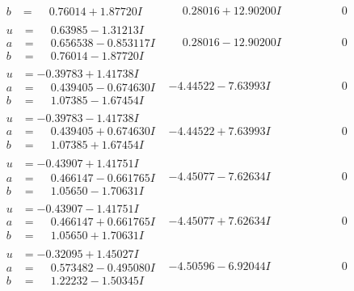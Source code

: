 \documentclass[1p]{elsarticle_modified}
\theoremstyle{definition}
\begin{document}
$$\begin{array}{c|c|c}
\begin{aligned}
b &= \phantom{-}0.76014 + 1.87720 I\end{aligned}
 & \phantom{-}0.28016 + 12.90200 I & \phantom{-0.000000 } 0 \\ \hline\begin{aligned}
u &= \phantom{-}0.63985 - 1.31213 I \\
a &= \phantom{-}0.656538 - 0.853117 I \\
b &= \phantom{-}0.76014 - 1.87720 I\end{aligned}
 & \phantom{-}0.28016 - 12.90200 I & \phantom{-0.000000 } 0 \\ \hline\begin{aligned}
u &= -0.39783 + 1.41738 I \\
a &= \phantom{-}0.439405 - 0.674630 I \\
b &= \phantom{-}1.07385 - 1.67454 I\end{aligned}
 & -4.44522 - 7.63993 I & \phantom{-0.000000 } 0 \\ \hline\begin{aligned}
u &= -0.39783 - 1.41738 I \\
a &= \phantom{-}0.439405 + 0.674630 I \\
b &= \phantom{-}1.07385 + 1.67454 I\end{aligned}
 & -4.44522 + 7.63993 I & \phantom{-0.000000 } 0 \\ \hline\begin{aligned}
u &= -0.43907 + 1.41751 I \\
a &= \phantom{-}0.466147 - 0.661765 I \\
b &= \phantom{-}1.05650 - 1.70631 I\end{aligned}
 & -4.45077 - 7.62634 I & \phantom{-0.000000 } 0 \\ \hline\begin{aligned}
u &= -0.43907 - 1.41751 I \\
a &= \phantom{-}0.466147 + 0.661765 I \\
b &= \phantom{-}1.05650 + 1.70631 I\end{aligned}
 & -4.45077 + 7.62634 I & \phantom{-0.000000 } 0 \\ \hline\begin{aligned}
u &= -0.32095 + 1.45027 I \\
a &= \phantom{-}0.573482 - 0.495080 I \\
b &= \phantom{-}1.22232 - 1.50345 I\end{aligned}
 & -4.50596 - 6.92044 I & \phantom{-0.000000 } 0 \\ \hline\begin{aligned}

\end{aligned}
\end{array}$$
\end{document}
